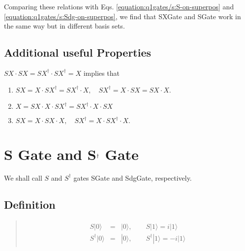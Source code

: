\documentclass[letterpaper,10pt,english]{jupyterBook}
\begin{document}
\sphinxAtStartPar
Comparing these relations with Eqs. \eqref{equation:q1gates/s:S-on-superpos} and \eqref{equation:q1gates/s:Sdg-on-superpos}, we find that SXGate and SGate work in the same way but in different basis sets.


\subsection{Additional useful Properties}
\label{\detokenize{q1gates/sx:additional-useful-properties}}
\sphinxAtStartPar
\(SX \cdot SX = SX^\dagger \cdot SX^\dagger = X\) implies that
\begin{enumerate}
%
\item {}
\sphinxAtStartPar
\(SX = X \cdot SX^\dagger = SX^\dagger\cdot X, \quad SX^\dagger = X \cdot SX = SX \cdot X\).

\item {}
\sphinxAtStartPar
\(X = SX \cdot X \cdot SX^\dagger = SX^\dagger \cdot X \cdot SX\)

\item {}
\sphinxAtStartPar
\(SX = X \cdot SX \cdot X, \quad SX^\dagger = X \cdot SX^\dagger \cdot X\).

\end{enumerate}

\sphinxstepscope


\section{S Gate and S\protect\(^\dagger\protect\) Gate}
\label{\detokenize{q1gates/s:s-gate-and-s-dagger-gate}}\label{\detokenize{q1gates/s:sec-sgate}}\label{\detokenize{q1gates/s::doc}}
\sphinxAtStartPar
We shall call \(S\) and \(S^\dagger\) gates SGate and SdgGate, respectively.

\sphinxAtStartPar
{}


\subsection{Definition}
\label{\detokenize{q1gates/s:definition}}
\sphinxAtStartPar
{}
\begin{quote}
\begin{equation}\label{equation:q1gates/s:SGate}
\begin{split}\begin{eqnarray}
S |0\rangle &=& |0\rangle, \qquad S |1\rangle = i|1\rangle \\
S^\dagger |0\rangle &=& |0\rangle, \qquad S^\dagger |1\rangle = -i|1\rangle
\end{eqnarray}
\end{split}
\end{equation}\end{quote}
\end{document}
